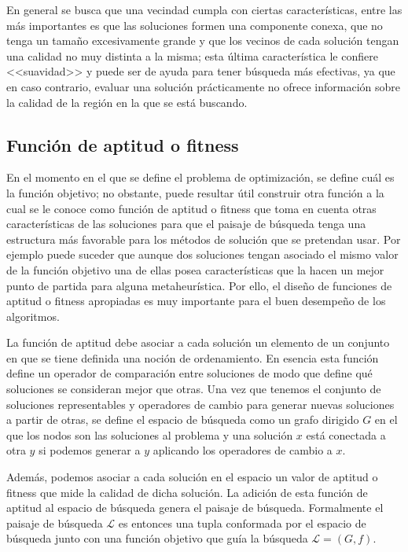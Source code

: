 En general se busca que una vecindad cumpla con ciertas características, entre las más importantes es que las soluciones formen una componente conexa, 
que no tenga un tamaño excesivamente grande y que los vecinos de cada solución tengan una calidad no muy distinta a la misma;
esta última característica le confiere <<suavidad>> y puede ser de ayuda para tener búsqueda más efectivas, ya que en caso contrario, evaluar una
solución prácticamente no ofrece información sobre la calidad de la región en la que se está buscando.

\subsection{Funci\'on de aptitud o fitness}
En el momento en el que se define el problema de optimización, se define cuál es la función objetivo; 
no obstante, puede resultar útil construir otra función a la cual se le conoce como función de aptitud o fitness que toma en cuenta otras características 
de las soluciones para que el paisaje de búsqueda tenga una estructura más favorable para los métodos de solución que se pretendan usar. 
%
Por ejemplo puede suceder que aunque dos soluciones tengan asociado el mismo valor de la función objetivo una de ellas posea características que la hacen 
un mejor punto de partida para alguna metaheurística.
%
Por ello, el diseño de funciones de aptitud o fitness apropiadas es muy importante para el buen desempeño de los algoritmos.

La función de aptitud debe asociar a cada solución un elemento de un conjunto en que se tiene definida una noción de ordenamiento. 
%
En esencia esta función define un operador de comparación entre soluciones de modo que define qué soluciones se consideran mejor que otras.
%
Una vez que tenemos el conjunto de soluciones representables y operadores de cambio para generar nuevas soluciones a partir de otras, se define 
el espacio de búsqueda como un grafo dirigido $G$ en el que los nodos son las soluciones al problema y una solución $x$ está conectada a otra $y$ 
si podemos generar a $y$ aplicando los operadores de cambio a $x$.

Además, podemos asociar a cada solución en el espacio un valor de aptitud o fitness que mide la calidad de dicha solución. 
%
La adición de esta función de aptitud al espacio de búsqueda genera el paisaje de búsqueda. 
%
Formalmente el paisaje de búsqueda $\mathcal{L}$ es entonces una tupla conformada por el espacio de búsqueda junto con una función objetivo que 
guía la búsqueda $\mathcal{L}=(G,f)$.

